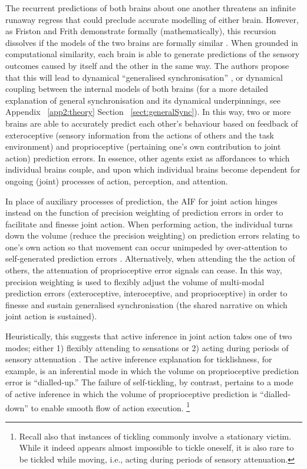 \begin{CJK}{UTF8}{gbsn}
The recurrent predictions of both brains about one another threatens an infinite runaway regress that could preclude accurate modelling of either brain.  However, as Friston and Frith demonstrate formally (mathematically), this recursion dissolves if the models of the two brains are formally similar \citep{Friston2015}.  When grounded in computational similarity, each brain is able to generate predictions of the sensory outcomes caused by itself and the other in the same way.  The authors propose that this will lead to dynamical ``generalised synchronisation'' \citep{Barreto2003}, or dynamical coupling between the internal models of both brains (for a more detailed explanation of general synchronisation and its dynamical underpinnings, see Appendix ~\ref{app2:theory} Section ~\ref{sect:generalSync}).  In this way, two or more brains are able to accurately predict each other's behaviour based on feedback of exteroceptive (sensory information from the actions of others and the task environment) and proprioceptive (pertaining one's own contribution to joint action) prediction errors.  In essence, other agents exist as affordances to which individual brains couple, and upon which individual brains become dependent for ongoing (joint) processes of action, perception, and attention.

In place of auxiliary processes of prediction, the AIF for joint action hinges instead on the function of precision weighting of prediction errors in order to facilitate and finesse joint action.  When performing action, the individual turns down the volume (reduce the precision weighting) on prediction errors relating to one's own action so that movement can occur unimpeded by over-attention to self-generated prediction errors \citep[an intuitive example of the opposite of this ideal scenario is when the flow of speech is interrupted due to the availability of exteroceptive auditory feedback in the case of a Skype call][]{Friston2015}.  Alternatively, when attending the the action of others, the attenuation of proprioceptive error signals can cease. In this way, precision weighting is used to flexibly adjust the volume of multi-modal prediction errors (exteroceptive, interoceptive, and proprioceptive) in order to finesse and sustain generalised synchronisation (the shared narrative on which joint action is sustained).

Heuristically, this suggests that active inference in joint action takes one of two modes; either 1) flexibly attending to sensations or
2) acting during periods of sensory attenuation \citep{Friston2015}.  The active inference explanation for ticklishness, for example, is an inferential mode in which the volume on proprioceptive prediction error is ``dialled-up.''  The failure of self-tickling, by contrast, pertains to a mode of active inference in which the volume of proprioceptive prediction is ``dialled-down'' to enable smooth flow of action execution.
  \footnote{Recall also that instances of tickling commonly involve a stationary victim. While it indeed appears almost impossible to tickle oneself, it is also rare to be tickled while moving, i.e., acting during periods of sensory attenuation.}



\end{CJK}
